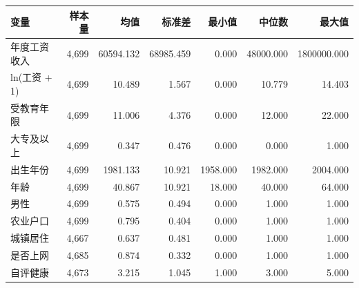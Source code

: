 \begin{tabular}{lrrrrrr}
\toprule
变量 & 样本量 & 均值 & 标准差 & 最小值 & 中位数 & 最大值 \\
\midrule
年度工资收入 & 4,699 & 60594.132 & 68985.459 & 0.000 & 48000.000 & 1800000.000 \\
ln(工资 + 1) & 4,699 & 10.489 & 1.567 & 0.000 & 10.779 & 14.403 \\
受教育年限 & 4,699 & 11.006 & 4.376 & 0.000 & 12.000 & 22.000 \\
大专及以上 & 4,699 & 0.347 & 0.476 & 0.000 & 0.000 & 1.000 \\
出生年份 & 4,699 & 1981.133 & 10.921 & 1958.000 & 1982.000 & 2004.000 \\
年龄 & 4,699 & 40.867 & 10.921 & 18.000 & 40.000 & 64.000 \\
男性 & 4,699 & 0.575 & 0.494 & 0.000 & 1.000 & 1.000 \\
农业户口 & 4,699 & 0.795 & 0.404 & 0.000 & 1.000 & 1.000 \\
城镇居住 & 4,667 & 0.637 & 0.481 & 0.000 & 1.000 & 1.000 \\
是否上网 & 4,685 & 0.874 & 0.332 & 0.000 & 1.000 & 1.000 \\
自评健康 & 4,673 & 3.215 & 1.045 & 1.000 & 3.000 & 5.000 \\
\bottomrule
\end{tabular}
